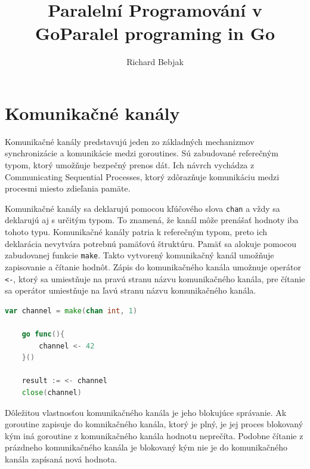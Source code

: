 \documentclass[
  biblatex,
  seconds=true,
  language=slovak,
  figures=false,
  glossaries,
  index
]{kidiplom}
\title{Paralelní Programování v Go}
\title[english]{Paralel programing in Go}
\author{Richard Bebjak}
\begin{document}
\maketitle



\newcommand{\BibLaTeX}{\textsc{Bib}\LaTeX}



\section{Komunikačné kanály}
Komunikačné kanály predstavujú jeden zo základných mechanizmov synchronizácie a komunikácie medzi goroutines. Sú zabudované referečným typom,
ktorý umožňuje bezpečný prenos dát. Ich návrch vychádza z Communicating Sequential Processes, 
ktorý zdôrazňuje komunikáciu medzi procesmi miesto zdieľania pamäte.\cite{cox2017}

Komunikačné kanály sa deklarujú pomocou kľúčového slova \texttt{chan}
a vždy sa deklarujú aj s určitým typom. To znamená, že kanál môže prenášať hodnoty
iba tohoto typu. 
Komunikačné kanály patria k referečným typom, preto ich deklarácia nevytvára potrebnú pamäťovú štruktúru.
Pamäť sa alokuje pomocou zabudovanej funkcie \texttt{make}. Takto vytvorený komunikačný kanál umožňuje zapisovanie a čítanie hodnôt.
Zápis do komunikačného kanála umožnuje operátor \texttt{<-}, ktorý sa umiestňuje na pravú stranu názvu komunikačného kanála,
pre čítanie sa operátor umiestňuje na ľavú stranu názvu komunikačného kanála.
\begin{lstlisting}[language=Go]
    var channel = make(chan int, 1)

    go func(){
        channel <- 42
    }()

    result := <- channel
    close(channel)
\end{lstlisting}

Dôležitou vlastnosťou komunikačného kanála je jeho blokujúce správanie. Ak goroutine zapisuje do komnikačného kanála, ktorý je plný, je jej proces
blokovaný kým iná goroutine z komunikačného kanála hodnotu neprečíta. Podobne čítanie z prázdneho komunikačného kanála je blokovaný kým nie je do
komunikačného kanála zapísaná nová hodnota.
\end{document}
